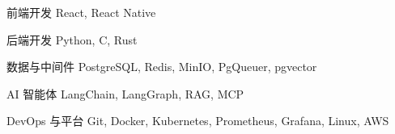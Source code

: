 

\begin{cvskills}

\cvskill
  {前端开发}
  {React, React Native}

  \cvskill
    {后端开发}
    {Python, C, Rust}

  \cvskill
    {数据与中间件}
    {PostgreSQL, Redis, MinIO, PgQueuer, pgvector}

  \cvskill
    {AI 智能体}
    {LangChain, LangGraph, RAG, MCP}

  \cvskill
    {DevOps 与平台}
    {Git, Docker, Kubernetes, Prometheus, Grafana, Linux, AWS}

\end{cvskills}
